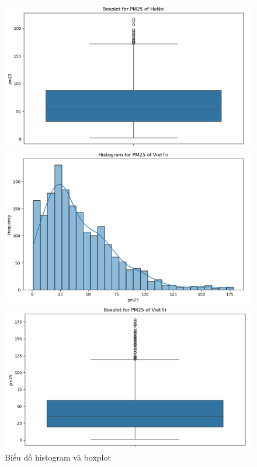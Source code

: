 \begin{figure}[H]
  \begin{minipage}{0.15\textwidth}
      \centering
      \includegraphics[width=1\textwidth]{img/final/Dataset/boxplot_hn.png}
      \end{minipage}
      \hfill
      \begin{minipage}{0.15\textwidth}
      \centering
      \includegraphics[width=1\textwidth]{img/final/Dataset/histogram_vt.png}
      \end{minipage}
      \hfill
      \begin{minipage}{0.15\textwidth}
      \centering
      \includegraphics[width=1\textwidth]{img/final/Dataset/boxplot_vt.png}
      
      \end{minipage}
      \hfill
  
  \caption{Biểu đồ histogram và boxplot}
  \label{fig:Random_Forest}
\end{figure}


